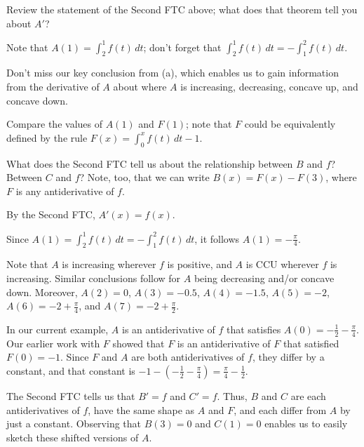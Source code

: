 \begin{bighint}
\ba
	\item Review the statement of the Second FTC above; what does that theorem tell you about $A'$?
	\item Note that $A(1)= \int_2^1 f(t) \, dt$; don't forget that $\int_2^1 f(t) \, dt = -\int_1^2 f(t) \, dt$.
	\item Don't miss our key conclusion from (a), which enables us to gain information from the derivative of $A$ about where $A$ is increasing, decreasing, concave up, and concave down.
	\item Compare the values of $A(1)$ and $F(1)$; note that $F$ could be equivalently defined by the rule $F(x) = \int_0^x f(t) \, dt - 1$.
	\item What does the Second FTC tell us about the relationship between $B$ and $f$?  Between $C$ and $f$?  Note, too, that we can write $B(x) = F(x) - F(3)$, where $F$ is any antiderivative of $f$.
\ea
\end{bighint}
\begin{activitySolution}
\ba
	\item By the Second FTC, $A'(x) = f(x)$.
	\item Since $A(1)= \int_2^1 f(t) \, dt = -\int_1^2 f(t) \, dt$, it follows $A(1) = -\frac{\pi}{4}$.
	\item Note that $A$ is increasing wherever $f$ is positive, and $A$ is CCU wherever $f$ is increasing.  Similar conclusions follow for $A$ being decreasing and/or concave down.  Moreover, $A(2) = 0$, $A(3) = -0.5$, $A(4) = -1.5$, $A(5) = -2$, $A(6) = -2 + \frac{\pi}{4}$, and $A(7) = -2 + \frac{\pi}{2}$.
	\item In our current example, $A$ is an antiderivative of $f$ that satisfies $A(0) = -\frac{1}{2} - \frac{\pi}{4}$.  Our earlier work with $F$ showed that $F$ is an antiderivative of $F$ that satisfied $F(0) = -1$.  Since $F$ and $A$ are both antiderivatives of $f$, they differ by a constant, and that constant is $-1 - (-\frac{1}{2} - \frac{\pi}{4}) = \frac{\pi}{4} - \frac{1}{2}$.
	\item The Second FTC tells us that $B' = f$ and $C' = f$.  Thus, $B$ and $C$ are each antiderivatives of $f$, have the same shape as $A$ and $F$, and each differ from $A$ by just a constant.  Observing that $B(3) = 0$ and $C(1) = 0$ enables us to easily sketch these shifted versions of $A$.
\ea
\end{activitySolution}
\aftera